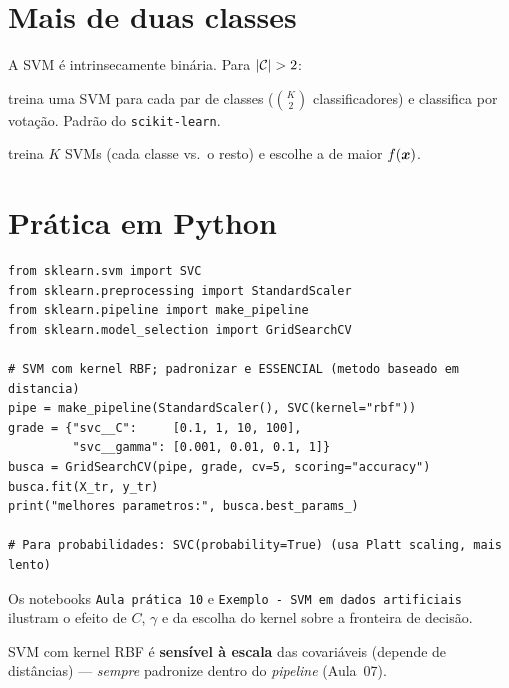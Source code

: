 \documentclass[11pt,a4paper]{article}
\begin{document}
\section{Mais de duas classes}
A SVM é intrinsecamente binária. Para $\left\lvert \mathcal{C} \right\rvert>2$:
\begin{description}[leftmargin=2.8cm,style=nextline]
  \item[Um-contra-um (OvO)] treina uma SVM para cada par de classes
        ($\binom{K}{2}$ classificadores) e classifica por votação. Padrão do
        \texttt{scikit-learn}.
  \item[Um-contra-todos (OvA)] treina $K$ SVMs (cada classe vs.\ o resto) e escolhe
        a de maior $f(\bm{x})$.
\end{description}

\section{Prática em Python}
\begin{lstlisting}
from sklearn.svm import SVC
from sklearn.preprocessing import StandardScaler
from sklearn.pipeline import make_pipeline
from sklearn.model_selection import GridSearchCV

# SVM com kernel RBF; padronizar e ESSENCIAL (metodo baseado em distancia)
pipe = make_pipeline(StandardScaler(), SVC(kernel="rbf"))
grade = {"svc__C":     [0.1, 1, 10, 100],
         "svc__gamma": [0.001, 0.01, 0.1, 1]}
busca = GridSearchCV(pipe, grade, cv=5, scoring="accuracy")
busca.fit(X_tr, y_tr)
print("melhores parametros:", busca.best_params_)

# Para probabilidades: SVC(probability=True) (usa Platt scaling, mais lento)
\end{lstlisting}
Os notebooks \texttt{Aula prática 10} e \texttt{Exemplo - SVM em dados artificiais}
ilustram o efeito de $C$,
$\gamma$ e da escolha do kernel sobre a fronteira de decisão.

\begin{atencao}
SVM com kernel RBF é \textbf{sensível à escala} das covariáveis (depende de
distâncias) --- \emph{sempre} padronize dentro do \emph{pipeline} (Aula~07).
\end{atencao}

\end{document}
